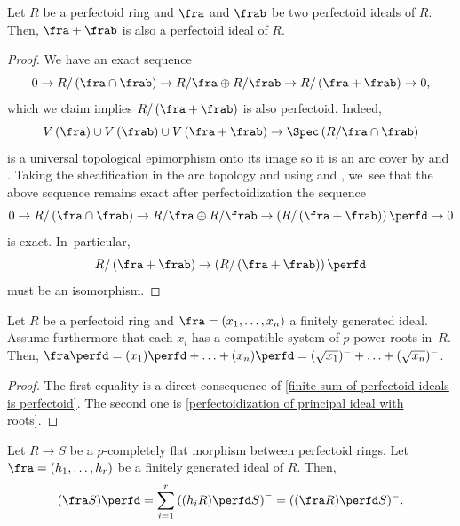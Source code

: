 \begin{proposition}\label{finite sum of perfectoid ideals is perfectoid}
Let $R$ be a perfectoid ring and $\fra$ and $\frab$ be two perfectoid ideals of $R$. Then, $\fra+\frab$ is also a perfectoid ideal of $R$.
\end{proposition}

\begin{proof}
We have an exact sequence
\begin{equation}\label{intersection sum exact sequence}
0\to R/\left(\fra\cap \frab\right) \to R/\fra \oplus R/\frab \to R/\left(\fra + \frab\right)\to 0,
\end{equation}
which we claim implies $R/\left(\fra + \frab\right)$ is also perfectoid. Indeed,
\[
V\left(\fra\right)\cup V\left(\frab\right)\cup V\left(\fra+\frab\right) \to \Spec\left(R/\fra\cap \frab\right)
\]
is a universal topological epimorphism onto its image so it is an arc cover by \cite[Prop.\,2.6]{BhattMathewArcTop} and \cite[Th.\,2.8]{RydhSubmersionsEffectiveDescent}.
Taking the sheafification in the arc topology and using \cite[Cor.\,8.11]{BhattScholzePrisms} and \cite[Th.\,2.9]{BhattScholzeProjectivityWittGrassmannian}, we~see that the above sequence remains exact after perfectoidization \ie the sequence
\[
0\to R/\left(\fra\cap \frab\right) \to R/\fra \oplus R/\frab \to \left(R/\left(\fra + \frab\right)\right)\perfd \to 0
\]
is exact. In~particular,
\[
R/\left(\fra + \frab\right) \to \left(R/\left(\fra + \frab\right)\right)\perfd
\]
must be an isomorphism.
\end{proof}

\begin{corollary}\label{perfectoidization is sum of perfectoidizations}
Let $R$ be a perfectoid ring and $\fra=(x_1,\ldots,x_n)$ a finitely generated ideal. Assume furthermore that each $x_i$ has a compatible system of $p$-power roots in~$R$. Then, $\fra\perfd=(x_1)\perfd+\ldots+(x_n)\perfd=(\sqrt{x_1})^{-}+\ldots + (\sqrt{x_n})^{-}$.
\end{corollary}

\begin{proof}
The first equality is a direct consequence of \autoref{finite sum of perfectoid ideals is perfectoid}. The second one is \autoref{perfectoidization of principal ideal with roots}.
\end{proof}

\begin{proposition}
\label{perfectoid ideal under pcflat extension of pfd rings}
Let $R \to S$ be a $p$-completely flat morphism between perfectoid rings. Let $\fra=(h_1,\ldots,h_r)$ be a finitely generated ideal of $R$.
Then,
\[
(\fra S)\perfd=\sum_{i=1}^r \left((h_i R)\perfd S \right)^{-}=((\fra R)\perfd S)^-.
\]
\end{proposition}

